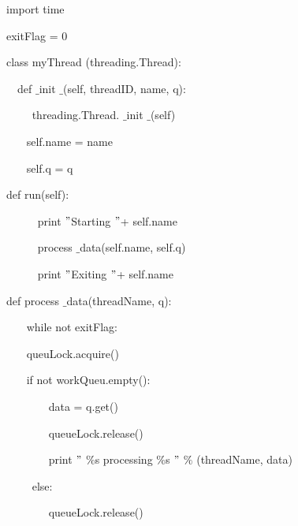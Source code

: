 \documentclass{wileySix}
\begin{document}
\noindent 
{\fontsize{10pt}{10pt}\selectfont import time} \par
\vspace{10pt}
\noindent 
{\fontsize{10pt}{10pt}\selectfont exitFlag = 0} \par
\vspace{10pt}
\noindent 
{\fontsize{10pt}{10pt}\selectfont class myThread (threading.Thread):} \par
\noindent 
{\fontsize{10pt}{10pt}\selectfont ~~def   $  \_  $init $  \_  $(self, threadID, name, q):} \par
\noindent 
{\fontsize{10pt}{10pt}\selectfont ~~~~ threading.Thread. $  \_  $init $  \_  $(self)} \par
\noindent 
{\fontsize{10pt}{10pt}\selectfont ~~~ self.name = name} \par
\noindent 
{\fontsize{10pt}{10pt}\selectfont ~~~ self.q = q} \par
\noindent 
{\fontsize{10pt}{10pt}\selectfont  def run(self):} \par
\noindent 
{\fontsize{10pt}{10pt}\selectfont ~~~~~ print  $ " $Starting  $ " $+ self.name} \par
\noindent 
{\fontsize{10pt}{10pt}\selectfont ~~~~~ process $  \_  $data(self.name, self.q)} \par
\noindent 
{\fontsize{10pt}{10pt}\selectfont ~~~~~ print  $ " $Exiting  $ " $+ self.name} \par
\vspace{10pt}
\noindent 
{\fontsize{10pt}{10pt}\selectfont def process $  \_  $data(threadName, q):} \par
\noindent 
{\fontsize{10pt}{10pt}\selectfont ~~~ while not exitFlag:} \par
\noindent 
{\fontsize{10pt}{10pt}\selectfont ~~~ queuLock.acquire()} \par
\noindent 
{\fontsize{10pt}{10pt}\selectfont ~~~ if not workQueu.empty():} \par
\noindent 
{\fontsize{10pt}{10pt}\selectfont ~~~~~~~ data = q.get()} \par
\noindent 
{\fontsize{10pt}{10pt}\selectfont ~~~~~~~ queueLock.release()} \par
\noindent 
{\fontsize{10pt}{10pt}\selectfont ~~~~~~~ print  $ " $ $  \%  $s processing  $  \%  $s $ " $  $  \%  $ (threadName, data)} \par
\noindent 
{\fontsize{10pt}{10pt}\selectfont ~~~~ else:} \par
\noindent 
{\fontsize{10pt}{10pt}\selectfont ~~~~~~~ queueLock.release()} \par
\end{document}

